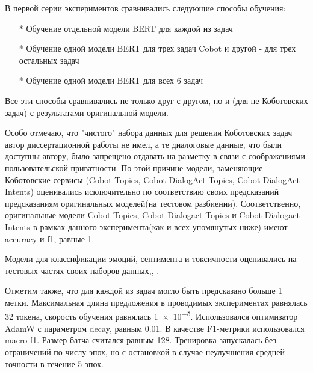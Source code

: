 В первой серии экспериментов сравнивались следующие способы обучения:
\begin{itemize}
\item[*] Обучение отдельной модели BERT для каждой из задач
\item[*] Обучение одной модели BERT для трех задач Cobot и другой - для трех остальных задач
\item[*] Обучение одной модели BERT для всех 6 задач
\end{itemize}

Все эти способы сравнивались не только друг с другом, но и (для не-Коботовских задач) с результатами оригинальной модели. 

Особо отмечаю, что "чистого" набора данных для решения Коботовских задач автор диссертационной работы не имел, а те диалоговые данные, что были доступны автору, было запрещено отдавать на разметку в связи с соображениями пользовательской приватности. По этой причине модели, заменяющие Коботовские сервисы (Cobot Topics, Cobot DialogAct Topics, Cobot DialogAct Intents) оценивались исключительно по соответствию своих предсказаний предсказаниям оригинальных моделей(на тестовом разбиении). Соответственно, оригинальные модели Cobot Topics, Cobot Dialogact Topics и Cobot Dialogact Intents в рамках данного эксперимента(как и всех упомянутых ниже) имеют accuracy и f1, равные 1. 

Модели для классификации эмоций, сентимента и токсичности оценивались на тестовых частях своих наборов данных\cite{socher_2013},\cite{na_website_ndo_emo},\cite{na_website_ndm_toxic} . 


Отметим также, что для каждой из задач могло быть предсказано больше 1 метки.
Максимальная длина предложения в проводимых экспериментах равнялась 32 токена, скорость обучения равнялась \num{1e-5}. Использовался оптимизатор AdamW с параметром decay, равным 0.01. В качестве F1-метрики использовался macro-f1. Размер батча считался равным 128. Тренировка запускалась без ограничений по числу эпох, но с остановкой в случае неулучшения средней точности в течение 5 эпох.



